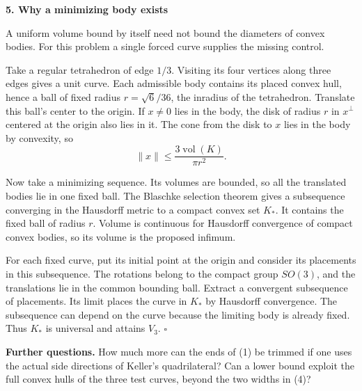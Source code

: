 \documentclass[11pt,letterpaper]{article}
\newcommand{\heading}[1]{{\large\sffamily\bfseries\color{ink}#1}\par\smallskip}
\newcommand{\term}[1]{\textbf{\color{ink}#1}}
\DeclareMathOperator{\vol}{vol}
\newcommand{\done}{\hfill\(\square\)}
\begin{document}
\newpage
\heading{5. Why a minimizing body exists}
A uniform volume bound by itself need not bound the diameters of convex bodies. For this problem a single forced curve supplies the missing control.

Take a regular tetrahedron of edge \(1/3\). Visiting its four vertices along three edges gives a unit curve. Each admissible body contains its placed convex hull, hence a ball of fixed radius \(r=\sqrt6/36\), the inradius of the tetrahedron. Translate this ball's center to the origin. If \(x\ne0\) lies in the body, the disk of radius \(r\) in \(x^\perp\) centered at the origin also lies in it. The cone from the disk to \(x\) lies in the body by convexity, so
\[
 \|x\|\le\frac{3\vol(K)}{\pi r^2}.
\]

Now take a minimizing sequence. Its volumes are bounded, so all the translated bodies lie in one fixed ball. The Blaschke selection theorem gives a subsequence converging in the Hausdorff metric to a compact convex set \(K_\ast\). It contains the fixed ball of radius \(r\). Volume is continuous for Hausdorff convergence of compact convex bodies, so its volume is the proposed infimum.

For each fixed curve, put its initial point at the origin and consider its placements in this subsequence. The rotations belong to the compact group \(SO(3)\), and the translations lie in the common bounding ball. Extract a convergent subsequence of placements. Its limit places the curve in \(K_\ast\) by Hausdorff convergence. The subsequence can depend on the curve because the limiting body is already fixed. Thus \(K_\ast\) is universal and attains \(V_3\). \done

\term{Further questions.} How much more can the ends of (1) be trimmed if one uses the actual side directions of Keller's quadrilateral? Can a lower bound exploit the full convex hulls of the three test curves, beyond the two widths in (4)?
\end{document}
